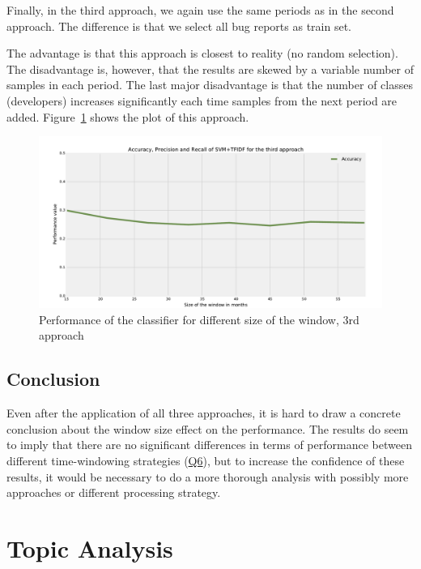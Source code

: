 Finally, in the third approach, we again use the same periods as in the second approach. The difference is that we select all bug reports as train set.

The advantage is that this approach is closest to reality (no random selection). The disadvantage is, however, that the results are skewed by a variable number of samples in each period. The last major disadvantage is that the number of classes (developers) increases significantly each time samples from the next period are added. Figure~\ref{fig:window.firefox.3a} shows the plot of this approach.

\begin{figure}[htbp]
    \centering
        \includegraphics[width=\textwidth]{./images/window_size/firefox_3a.pdf}
    \caption{Performance of the classifier for different size of the window, 3rd approach}
    \label{fig:window.firefox.3a}
\end{figure}

\subsection{Conclusion}

Even after the application of all three approaches, it is hard to draw a concrete conclusion about the window size effect on the performance. The results do seem to imply that there are no significant differences in terms of performance between different time-windowing strategies (\hyperlink{question:6}{Q6}), but to increase the confidence of these results, it would be necessary to do a more thorough analysis with possibly more approaches or different processing strategy.

\section{Topic Analysis}

